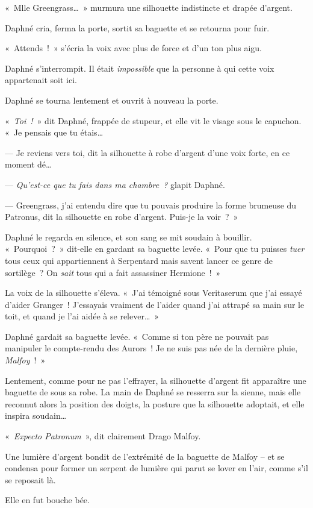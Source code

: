 «~Mlle Greengrass…~»
murmura une silhouette indistincte et drapée d'argent.

Daphné cria, ferma la porte, sortit sa baguette et se retourna pour fuir.

«~Attends~!~»
s'écria la voix avec plus de force et d'un ton plus aigu.

Daphné s'interrompit.
Il était \emph{impossible} que la personne à qui cette voix appartenait soit ici.

Daphné se tourna lentement et ouvrit à nouveau la porte.

«~\emph{Toi~!}~» dit Daphné, frappée de stupeur, et elle vit le visage sous le capuchon.
«~Je pensais que tu étais…

--- Je reviens vers toi, dit la silhouette à robe d'argent d'une voix forte, en ce moment dé…

--- \emph{Qu'est-ce que tu fais dans ma chambre~?} glapit Daphné.

--- Greengrass, j'ai entendu dire que tu pouvais produire la forme brumeuse du Patronus, dit la silhouette en robe d'argent.
Puis-je la voir~?~»

Daphné le regarda en silence, et son sang se mit soudain à bouillir.
«~Pourquoi~?~»
dit-elle en gardant sa baguette levée.
«~Pour que tu puisses \emph{tuer} tous ceux qui appartiennent à Serpentard mais savent lancer ce genre de sortilège~?
On \emph{sait} tous qui a fait assassiner Hermione~!~»

La voix de la silhouette s'éleva.
«~J'ai témoigné sous Veritaserum que j'ai essayé d'aider Granger~!
J'essayais vraiment de l'aider quand j'ai attrapé sa main sur le toit, et quand je l'ai aidée à se relever…~»

Daphné gardait sa baguette levée.
«~Comme si ton père ne pouvait pas manipuler le compte-rendu des Aurors~!
Je ne suis pas née de la dernière pluie, \emph{Malfoy}~!~»

Lentement, comme pour ne pas l'effrayer, la silhouette d'argent fit apparaître une baguette de sous sa robe.
La main de Daphné se resserra sur la sienne, mais elle reconnut alors la position des doigts, la posture que la silhouette adoptait, et elle inspira soudain…

«~\emph{Expecto Patronum}~», dit clairement Drago Malfoy.

Une lumière d'argent bondit de l'extrémité de la baguette de Malfoy -- et se condensa pour former un serpent de lumière qui parut se lover en l'air, comme s'il se reposait là.

Elle en fut bouche bée.

